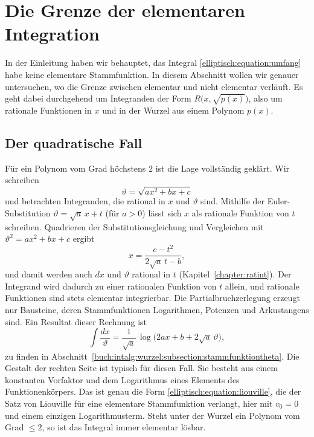%
%
%
%
\section{Die Grenze der elementaren Integration
\label{elliptisch:section:grenze}}

In der Einleitung haben wir behauptet, das Integral
\eqref{elliptisch:equation:umfang} habe keine elementare
Stammfunktion.
In diesem Abschnitt wollen wir genauer untersuchen, wo die Grenze
zwischen elementar und nicht elementar verläuft.
Es geht dabei durchgehend um Integranden der Form
$R\bigl(x,\sqrt{p(x)}\bigr)$, also um rationale Funktionen in $x$
und in der Wurzel aus einem Polynom $p(x)$.

\subsection{Der quadratische Fall
\label{elliptisch:subsection:quadratisch}}
%
Für ein Polynom vom Grad höchstens $2$ ist die Lage vollständig
geklärt.
Wir schreiben
\begin{equation}
\vartheta = \sqrt{ax^2 + bx + c}
\label{elliptisch:equation:theta}
\end{equation}
und betrachten Integranden, die rational in $x$ und $\vartheta$
sind.
Mithilfe der Euler-Substitution $\vartheta = \sqrt{a}\,x + t$ (für
$a > 0$) lässt sich $x$ als rationale Funktion von $t$ schreiben.
Quadrieren der Substitutionsgleichung und Vergleichen mit
$\vartheta^2 = ax^2 + bx + c$ ergibt
\begin{equation}
x
=
\frac{c - t^2}{2\sqrt{a}\,t - b},
\label{elliptisch:equation:eulersubst}
\end{equation}
und damit werden auch $dx$ und $\vartheta$ rational in $t$
(Kapitel~\ref{chapter:ratint}).
Der Integrand wird dadurch zu einer rationalen Funktion von $t$
allein, und rationale Funktionen sind stets elementar integrierbar.
Die Partialbruchzerlegung erzeugt nur Bausteine, deren
Stammfunktionen Logarithmen, Potenzen und Arkustangens sind.
Ein Resultat dieser Rechnung ist
\begin{equation}
\int \frac{dx}{\vartheta}
=
\frac{1}{\sqrt{a}}\,
\log\bigl(2ax + b + 2\sqrt{a}\,\vartheta\bigr),
\label{elliptisch:equation:quadratisch}
\end{equation}
zu finden in
Abschnitt~\ref{buch:intalg:wurzel:subsection:stammfunktiontheta}.
Die Gestalt der rechten Seite ist typisch für diesen Fall.
Sie besteht aus einem konstanten Vorfaktor und dem Logarithmus
eines Elements des Funktionenkörpers.
Das ist genau die Form \eqref{elliptisch:equation:liouville}, die der Satz 
von Liouville für eine elementare
Stammfunktion verlangt, hier mit $v_0 = 0$ und einem einzigen
Logarithmusterm.
Steht unter der Wurzel ein Polynom vom Grad $\le 2$, so ist das
Integral immer elementar lösbar.

